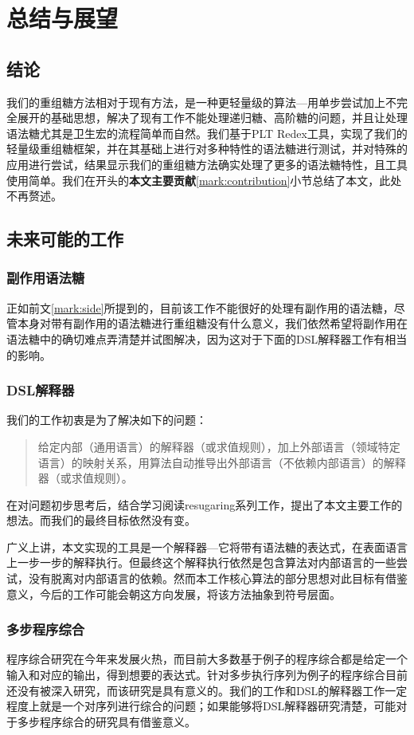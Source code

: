 \pagestyle{fancy}
\normalsize
\linespread{1.5}\selectfont
\label{mark:chapter6}\chapter{总结与展望}
\section{结论}
我们的重组糖方法相对于现有方法，是一种更轻量级的算法---用单步尝试加上不完全展开的基础思想，解决了现有工作不能处理递归糖、高阶糖的问题，并且让处理语法糖尤其是卫生宏的流程简单而自然。我们基于PLT Redex工具，实现了我们的轻量级重组糖框架，并在其基础上进行对多种特性的语法糖进行测试，并对特殊的应用进行尝试，结果显示我们的重组糖方法确实处理了更多的语法糖特性，且工具使用简单。我们在开头的{\bfseries 本文主要贡献}\ref{mark:contribution}小节总结了本文，此处不再赘述。



\section{未来可能的工作}

\subsection{副作用语法糖}

正如前文\ref{mark:side}所提到的，目前该工作不能很好的处理有副作用的语法糖，尽管本身对带有副作用的语法糖进行重组糖没有什么意义，我们依然希望将副作用在语法糖中的确切难点弄清楚并试图解决，因为这对于下面的DSL解释器工作有相当的影响。

\subsection{DSL解释器}
我们的工作初衷是为了解决如下的问题：

\begin{quote}
	给定内部（通用语言）的解释器（或求值规则），加上外部语言（领域特定语言）的映射关系，用算法自动推导出外部语言（不依赖内部语言）的解释器（或求值规则）。
\end{quote}

在对问题初步思考后，结合学习阅读resugaring系列工作，提出了本文主要工作的想法。而我们的最终目标依然没有变。

广义上讲，本文实现的工具是一个解释器---它将带有语法糖的表达式，在表面语言上一步一步的解释执行。但最终这个解释执行依然是包含算法对内部语言的一些尝试，没有脱离对内部语言的依赖。然而本工作核心算法的部分思想对此目标有借鉴意义，今后的工作可能会朝这方向发展，将该方法抽象到符号层面。

\subsection{多步程序综合}

程序综合研究在今年来发展火热，而目前大多数基于例子的程序综合都是给定一个输入和对应的输出，得到想要的表达式。针对多步执行序列为例子的程序综合目前还没有被深入研究，而该研究是具有意义的。我们的工作和DSL的解释器工作一定程度上就是一个对序列进行综合的问题；如果能够将DSL解释器研究清楚，可能对于多步程序综合的研究具有借鉴意义。

\clearpage
